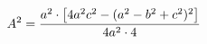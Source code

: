 \documentclass[preview]{standalone}
\begin{document}
\begin{align*}
\special{dvisvgm:raw <g id='unique000'>}A^2 = \frac{a^2 \cdot \left[4a^2c^2-(a^2-b^2+c^2)^2\right]}{4a^2 \cdot 4}\special{dvisvgm:raw </g>}
\end{align*}
\end{document}
